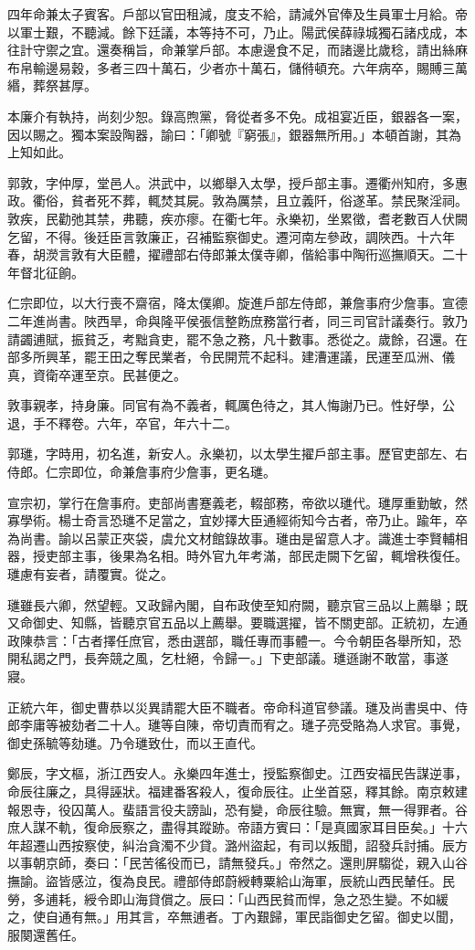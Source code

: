 \begin{pinyinscope}
四年命兼太子賓客。戶部以官田租減，度支不給，請減外官俸及生員軍士月給。帝以軍士艱，不聽減。餘下廷議，本等持不可，乃止。陽武侯薛祿城獨石諸戍成，本往計守禦之宜。還奏稱旨，命兼掌戶部。本慮邊食不足，而諸邊比歲稔，請出絲麻布帛輸邊易穀，多者三四十萬石，少者亦十萬石，儲偫頓充。六年病卒，賜賻三萬緡，葬祭甚厚。

本廉介有執持，尚刻少恕。錄高煦黨，脅從者多不免。成祖宴近臣，銀器各一案，因以賜之。獨本案設陶器，諭曰：「卿號『窮張』，銀器無所用。」本頓首謝，其為上知如此。

郭敦，字仲厚，堂邑人。洪武中，以鄉舉入太學，授戶部主事。遷衢州知府，多惠政。衢俗，貧者死不葬，輒焚其屍。敦為厲禁，且立義阡，俗遂革。禁民聚淫祠。敦疾，民勸弛其禁，弗聽，疾亦瘳。在衢七年。永樂初，坐累徵，耆老數百人伏闕乞留，不得。後廷臣言敦廉正，召補監察御史。遷河南左參政，調陜西。十六年春，胡濙言敦有大臣體，擢禮部右侍郎兼太僕寺卿，偕給事中陶衎巡撫順天。二十年督北征餉。

仁宗即位，以大行喪不齋宿，降太僕卿。旋進戶部左侍郎，兼詹事府少詹事。宣德二年進尚書。陜西旱，命與隆平侯張信整飭庶務當行者，同三司官計議奏行。敦乃請蠲逋賦，振貧乏，考黜貪吏，罷不急之務，凡十數事。悉從之。歲餘，召還。在部多所興革，罷王田之奪民業者，令民開荒不起科。建漕運議，民運至瓜洲、儀真，資衛卒運至京。民甚便之。

敦事親孝，持身廉。同官有為不義者，輒厲色待之，其人悔謝乃已。性好學，公退，手不釋卷。六年，卒官，年六十二。

郭璡，字時用，初名進，新安人。永樂初，以太學生擢戶部主事。歷官吏部左、右侍郎。仁宗即位，命兼詹事府少詹事，更名璡。

宣宗初，掌行在詹事府。吏部尚書蹇義老，輟部務，帝欲以璡代。璡厚重勤敏，然寡學術。楊士奇言恐璡不足當之，宜妙擇大臣通經術知今古者，帝乃止。踰年，卒為尚書。諭以呂蒙正夾袋，虞允文材館錄故事。璡由是留意人才。識進士李賢輔相器，授吏部主事，後果為名相。時外官九年考滿，部民走闕下乞留，輒增秩復任。璡慮有妄者，請覆實。從之。

璡雖長六卿，然望輕。又政歸內閣，自布政使至知府闕，聽京官三品以上薦舉；既又命御史、知縣，皆聽京官五品以上薦舉。要職選擢，皆不關吏部。正統初，左通政陳恭言：「古者擇任庶官，悉由選部，職任專而事體一。今令朝臣各舉所知，恐開私謁之門，長奔競之風，乞杜絕，令歸一。」下吏部議。璡遜謝不敢當，事遂寢。

正統六年，御史曹恭以災異請罷大臣不職者。帝命科道官參議。璡及尚書吳中、侍郎李庸等被劾者二十人。璡等自陳，帝切責而宥之。璡子亮受賂為人求官。事覺，御史孫毓等劾璡。乃令璡致仕，而以王直代。

鄭辰，字文樞，浙江西安人。永樂四年進士，授監察御史。江西安福民告謀逆事，命辰往廉之，具得誣狀。福建番客殺人，復命辰往。止坐首惡，釋其餘。南京敕建報恩寺，役囚萬人。蜚語言役夫謗訕，恐有變，命辰往驗。無實，無一得罪者。谷庶人謀不軌，復命辰察之，盡得其蹤跡。帝語方賓曰：「是真國家耳目臣矣。」十六年超遷山西按察使，糾治貪濁不少貸。潞州盜起，有司以叛聞，詔發兵討捕。辰方以事朝京師，奏曰：「民苦徭役而已，請無發兵。」帝然之。還則屏騶從，親入山谷撫諭。盜皆感泣，復為良民。禮部侍郎蔚綬轉粟給山海軍，辰統山西民輦任。民勞，多逋耗，綬令即山海貸償之。辰曰：「山西民貧而悍，急之恐生變。不如緩之，使自通有無。」用其言，卒無逋者。丁內艱歸，軍民詣御史乞留。御史以聞，服闋還舊任。


\end{pinyinscope}
